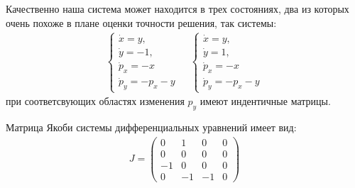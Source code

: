 \documentclass[a4paper,12pt]{article}
\begin{document}
Качественно наша система может находится в трех состояниях, два из которых очень похоже в плане оценки точности решения, так системы:
\begin{align*}
    \left\{
    \begin{array}{l}
        \dot x =y,\\
        \dot y= -1,\\
        \dot p_x= -x\\
        \dot p_y= -p_x -y
    \end{array}
    \right.
    \;\;\;\;
    \left\{
    \begin{array}{l}
        \dot x =y,\\
        \dot y= 1,\\
        \dot p_x= -x\\
        \dot p_y= -p_x -y
    \end{array}
    \right.
\end{align*}
при соответсвующих областях изменения $p_y$ имеют индентичные матрицы.

Матрица Якоби системы дифференциальных уравнений имеет вид:
\begin{align*}
    J=
    \left(
    \begin{array}{cccc}
        0&1&0&0\\
        0&0&0&0\\
        -1&0&0&0\\
        0&-1&-1&0
    \end{array}
    \right)
\end{align*}
\end{document}
